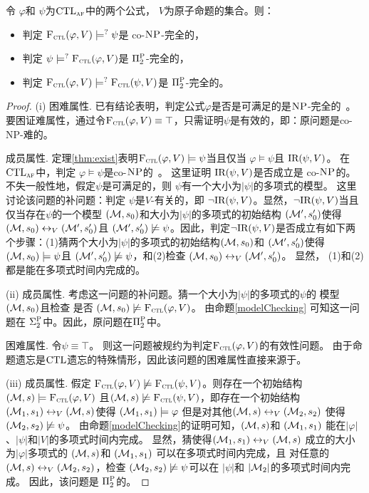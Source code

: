 \begin{theorem}[Entailment]
	\label{thm:comF}
	令 $\varphi$和 $\psi$为$\textrm{CTL}_{\textsc{a} \textsc{f}}$中的两个公式， $V$为原子命题的集合。则：
	\begin{itemize}
		\item[(i)] 判定  ${\textsc{F}_{\textsc{ctl}}}(\varphi, V ) \models^? \psi$是 co-$\textsc{NP}$-完全的，
		\item[(ii)] 判定  $\psi \models^? {\textsc{F}_{\textsc{ctl}}}(\varphi, V)$是 $\Pi_2^{\textsc{P}}$-完全的，
		\item[(iii)] 判定 ${\textsc{F}_{\textsc{ctl}}}(\varphi, V) \models^? {\textsc{F}_{\textsc{ctl}}}(\psi, V)$是 $\Pi_2^{\textsc{P}}$-完全的。
	\end{itemize}
\end{theorem}
\begin{proof}
	(i) 困难属性. 已有结论表明，判定公式$\varphi$是否是可满足的是$\textsc{NP}$-完全的~\cite{meier2009complexity}。要困证难属性，通过令${\textsc{F}_{\textsc{ctl}}}(\varphi, V)\equiv \top$，只需证明$\psi$是有效的，即：原问题是co-NP-难的。
	
	成员属性. 定理\ref{thm:exist}表明${\textsc{F}_{\textsc{ctl}}}(\varphi, V) \models \psi$当且仅当 $\varphi \models \psi$且 $\textrm{IR}(\psi, V)$。
	在$\textrm{CTL}_{\textsc{a} \textsc{f}}$中，判定 $\varphi \models \psi$是co-$\textsc{NP}$的~\cite{meier2009complexity}。
	这里证明 $\textrm{IR}(\psi, V)$是否成立是 co-$\textsc{NP}$的。不失一般性地，假定$\psi$是可满足的，则 $\psi$有一个大小为$|\psi|$的多项式的模型。
	这里讨论该问题的补问题：判定 $\psi$是$V$-有关的，即 $\neg \textrm{IR}(\psi, V)$。显然，$\neg \textrm{IR}(\psi, V)$当且仅当存在$\psi$的一个模型 $({\cal M},s_0)$和大小为$|\psi|$的多项式的初始结构 $({\cal M}',s_0')$使得 $({\cal M},s_0) \leftrightarrow_V ({\cal M}',s_0')$且 $({\cal M}',s_0') \not \models \psi$。因此，判定$\neg \textrm{IR}(\psi, V)$是否成立有如下两个步骤：(1)猜两个大小为$|\psi|$的多项式的初始结构$({\cal M},s_0)$和 $({\cal M}',s_0')$使得 $({\cal M},s_0) \models \psi$且 $({\cal M}',s_0') \not \models \psi$，和(2)检查 $({\cal M},s_0) \leftrightarrow_V ({\cal M}',s_0')$。
	显然， (1)和(2)都是能在多项式时间内完成的。
	
	(ii) 成员属性. 考虑这一问题的补问题。猜一个大小为$|\psi|$的多项式的$\psi$的 模型 $({\cal M},s_0)$且检查 是否 $({\cal M}, s_0) \not \models {\textsc{F}_{\textsc{ctl}}}(\varphi, V)$。
	由命题\ref{modelChecking} 可知这一问题在 $\Sigma_2^{\textsc{P}}$中。因此，原问题在$\Pi_2^{\textsc{P}}$中。
	
	困难属性. 令$\psi \equiv \top$。 则这一问题被规约为判定${\textsc{F}_{\textsc{ctl}}}(\varphi, V)$的有效性问题。 
	由于命题遗忘是$\textrm{CTL}$遗忘的特殊情形，因此该问题的困难属性直接来源于\cite{DBLP:journals/jair/LangLM03}。
	
	(iii) 成员属性. 假定 ${\textsc{F}_{\textsc{ctl}}}(\varphi, V) \not \models {\textsc{F}_{\textsc{ctl}}}(\psi, V)$。则存在一个初始结构 $({\cal M},s) 
	\models {\textsc{F}_{\textsc{ctl}}}(\varphi, V)$ 且$({\cal M},s) \not \models {\textsc{F}_{\textsc{ctl}}}(\psi, V)$，即存在一个初始结构$({\cal M}_1,s_1) \leftrightarrow_V ({\cal M},s)$使得 $({\cal M}_1, s_1) \models \varphi$ 但是对其他$({\cal M}, s) \leftrightarrow_V ({\cal M}_2,s_2)$ 使得 $({\cal M}_2, s_2) \not \models \psi$。
	由命题\ref{modelChecking}的证明可知，$({\cal M},s)$和 $({\cal M}_1,s_1)$ 能在$|\varphi|$、$|\psi|$和$|V|$的多项式时间内完成。 
	显然，猜使得$({\cal M}_1,s_1) \leftrightarrow_V ({\cal M},s)$ 成立的大小为$|\varphi|$多项式的 $({\cal M},s)$和 $({\cal M}_1,s_1)$ 可以在多项式时间内完成，且 对任意的 $({\cal M}, s) \leftrightarrow_V ({\cal M}_2,s_2)$，检查 $({\cal M}_2,s_2) \not \models \psi$可以在 $|\psi|$和 $|{\cal M}_2|$的多项式时间内完成。
	因此，该问题是 $\Pi_2^{\textsc{P}}$的。
	

\end{proof}
